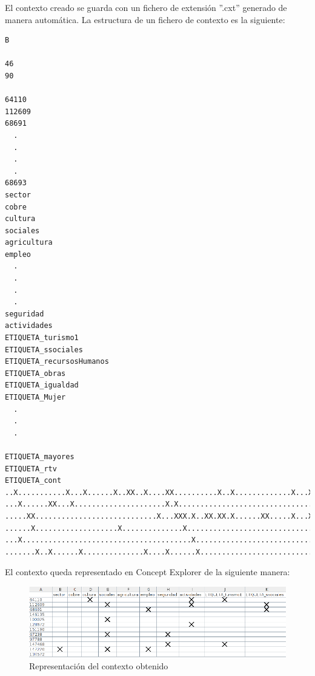 El contexto creado se guarda con un fichero de extensión ''.cxt'' generado de manera automática. La estructura de un fichero de contexto es la siguiente:
\begin{lstlisting}
B

46
90

64110
112609
68691
  .
  .
  .
  .
68693
sector
cobre
cultura
sociales
agricultura
empleo
  .
  .
  .
  .
seguridad
actividades
ETIQUETA_turismo1
ETIQUETA_ssociales
ETIQUETA_recursosHumanos
ETIQUETA_obras
ETIQUETA_igualdad
ETIQUETA_Mujer
  .
  .
  .
  
ETIQUETA_mayores
ETIQUETA_rtv
ETIQUETA_cont
..X...........X...X......X..XX..X....XX..........X..X.............X...X..........X........
...X......XX...X.....................X.X..................................................
.....XX............................X...XXX.X..XX.XX.X......XX.....X...X..X.......X........
......X...................X..............X................................................
...X.......................................X..............................................
.......X..X......X..............X....X......X.............................................

\end{lstlisting}

El contexto queda representado en Concept Explorer de la siguiente manera:

\begin{center}
\begin{figure}[h]

\includegraphics[scale=0.5]{fca/contexto.png}
\caption{Representación del contexto obtenido}
\label{fig:reticula}
\end{figure}
\end{center}
